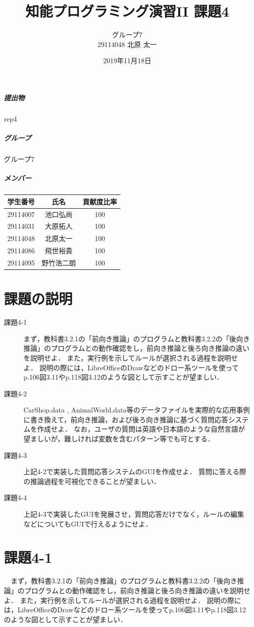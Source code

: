 \documentclass{jsarticle} %
\title{知能プログラミング演習II 課題4}
\author{グループ7\\
  29114048 北原 太一\\
}
\date{2019年11月18日}
\begin{document}
\maketitle

\subparagraph{提出物} rep4
\subparagraph{グループ} グループ7
\subparagraph{メンバー}
\begin{tabular}{|c|c|c|}
  \hline
  学生番号&氏名&貢献度比率\\
  \hline\hline
  29114007&池口弘尚&100\\
  \hline
  29114031&大原拓人&100\\
  \hline
  29114048&北原太一&100\\
  \hline
  29114086&飛世裕貴&100\\
  \hline
  29114095&野竹浩二朗&100\\
  \hline
\end{tabular}

\section{課題の説明}
\begin{description}
\item[課題4-1] まず，教科書3.2.1の「前向き推論」のプログラムと教科書3.2.2の「後向き推論」のプログラムとの動作確認をし，前向き推論と後ろ向き推論の違いを説明せよ．
  また，実行例を示してルールが選択される過程を説明せよ．
  説明の際には，LibreOfficeのDrawなどのドロー系ツールを使ってp.106図3.11やp.118図3.12のような図として示すことが望ましい．
\item[課題4-2] CarShop.data , AnimalWorld.data等のデータファイルを実際的な応用事例に書き換えて，前向き推論，および後ろ向き推論に基づく質問応答システムを作成せよ．
  なお，ユーザの質問は英語や日本語のような自然言語が望ましいが，難しければ変数を含むパターン等でも可とする．
\item[課題4-3] 上記4-2で実装した質問応答システムのGUIを作成せよ．
  質問に答える際の推論過程を可視化できることが望ましい．
\item[課題4-4] 上記4-3で実装したGUIを発展させ，質問応答だけでなく，ルールの編集などについてもGUIで行えるようにせよ．
\end{description}


\section{課題4-1}
\begin{screen}
　まず，教科書3.2.1の「前向き推論」のプログラムと教科書3.2.2の「後向き推論」のプログラムとの動作確認をし，前向き推論と後ろ向き推論の違いを説明せよ．
  また，実行例を示してルールが選択される過程を説明せよ．
  説明の際には，LibreOfficeのDrawなどのドロー系ツールを使ってp.106図3.11やp.118図3.12のような図として示すことが望ましい．
\end{screen}
\end{document}
